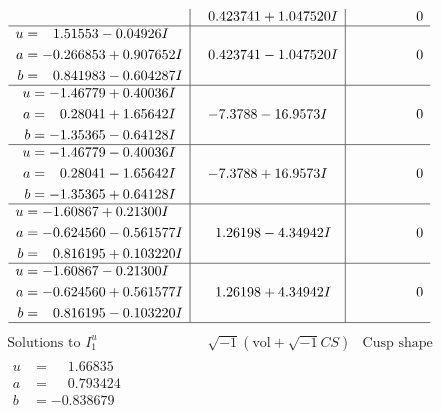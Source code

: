 \documentclass[1p]{elsarticle_modified}
\theoremstyle{definition}
\newcommand{\I}{\sqrt{-1}}
\begin{document}
$$\begin{array}{c|c|c}
 & \phantom{-}0.423741 + 1.047520 I & \phantom{-0.000000 } 0 \\ \hline\begin{aligned}
u &= \phantom{-}1.51553 - 0.04926 I \\
a &= -0.266853 + 0.907652 I \\
b &= \phantom{-}0.841983 - 0.604287 I\end{aligned}
 & \phantom{-}0.423741 - 1.047520 I & \phantom{-0.000000 } 0 \\ \hline\begin{aligned}
u &= -1.46779 + 0.40036 I \\
a &= \phantom{-}0.28041 + 1.65642 I \\
b &= -1.35365 - 0.64128 I\end{aligned}
 & -7.3788 - 16.9573 I & \phantom{-0.000000 } 0 \\ \hline\begin{aligned}
u &= -1.46779 - 0.40036 I \\
a &= \phantom{-}0.28041 - 1.65642 I \\
b &= -1.35365 + 0.64128 I\end{aligned}
 & -7.3788 + 16.9573 I & \phantom{-0.000000 } 0 \\ \hline\begin{aligned}
u &= -1.60867 + 0.21300 I \\
a &= -0.624560 - 0.561577 I \\
b &= \phantom{-}0.816195 + 0.103220 I\end{aligned}
 & \phantom{-}1.26198 - 4.34942 I & \phantom{-0.000000 } 0 \\ \hline\begin{aligned}
u &= -1.60867 - 0.21300 I \\
a &= -0.624560 + 0.561577 I \\
b &= \phantom{-}0.816195 - 0.103220 I\end{aligned}
 & \phantom{-}1.26198 + 4.34942 I & \phantom{-0.000000 } 0\\
 \hline 
 \end{array}$$\newpage$$\begin{array}{c|c|c}  
\text{Solutions to }I^u_{1}& \I (\text{vol} + \sqrt{-1}CS) & \text{Cusp shape}\\
 \hline 
\begin{aligned}
u &= \phantom{-}1.66835\phantom{ +0.000000I} \\
a &= \phantom{-}0.793424\phantom{ +0.000000I} \\
b &= -0.838679\phantom{ +0.000000I}\end{aligned}

\end{array}$$
\end{document}
